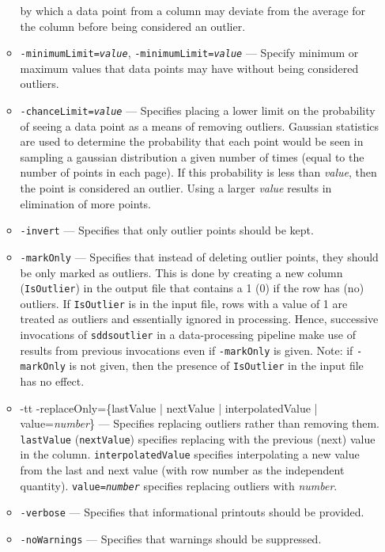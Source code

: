 \begin{itemize}
\begin{itemize}
        by which a data point from a column may deviate from the average for the column
        before being considered an outlier.
    \item {\tt -minimumLimit={\em value}}, {\tt -minimumLimit={\em value}} --- 
        Specify minimum or maximum values that data points may have without being considered
        outliers.
    \item {\tt -chanceLimit={\em value}} --- Specifies placing a lower limit on the probability
        of seeing a data point as a means of removing outliers.  Gaussian statistics are
        used to determine the probability that each point would be seen in sampling a gaussian
        distribution a given number of times (equal to the number of points in each page).
        If this probability is less than {\em value}, then the point is considered an outlier.
        Using a larger {\em value} results in elimination of more points.
    \item {\tt -invert} --- Specifies that only outlier points should be kept.
    \item {\tt -markOnly} --- Specifies that instead of deleting outlier points, they
        should be only marked as outliers.  This is done by creating a new column
        ({\tt IsOutlier}) in the output file that contains a 1 (0) if the row has (no)
        outliers.  If {\tt IsOutlier} is in the input file, rows with a value of 1 are
        treated as outliers and essentially ignored in processing.  Hence, successive
        invocations of {\tt sddsoutlier} in a data-processing pipeline make use of 
        results from previous invocations even if {\tt -markOnly} is given.  Note: if {\tt -markOnly}
        is not given, then the presence of {\tt IsOutlier} in the input file has no effect.
    \item {-tt -replaceOnly=\{lastValue | nextValue | interpolatedValue | value={\em number}\}} ---
        Specifies replacing outliers rather than removing them.  {\tt lastValue} ({\tt nextValue})
        specifies replacing with the previous (next) value in the column.  
        {\tt interpolatedValue} specifies interpolating a new value from the last and next value
        (with row number as the independent quantity).  {\tt value={\em number}} specifies 
        replacing outliers with {\em number}. 
    \item {\tt -verbose} --- Specifies that informational printouts should be provided.
    \item {\tt -noWarnings} --- Specifies that warnings should be suppressed.

\end{itemize}
\end{itemize}
